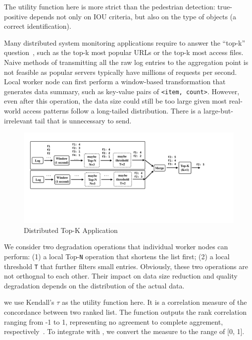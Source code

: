 The utility function here is more strict than the pedestrian detection:
true-positive depends not only on IOU criteria, but also on the type of objects
(a correct identification).

 Many distributed system monitoring applications
require to answer the ``top-k'' question~\cite{babcock2003distributed}, such as
the top-k most popular URLs or the top-k most access files. Naive methods of
transmitting all the raw log entries to the aggregation point is not feasible as
popular servers typically have millions of requests per second. Local worker
node can first perform a window-based transformation that generates data
summary, such as key-value pairs of \texttt{<item, count>}. However, even after
this operation, the data size could still be too large given most real-world
access patterns follow a long-tailed distribution. There is a
large-but-irrelevant tail that is unnecessary to send.

\begin{figure}
  \centering
  \includegraphics[width=\columnwidth]{figures/topk.pdf}
  \caption{Distributed Top-K Application}
  \label{fig:topk}
\end{figure}

We consider two degradation operations that individual worker nodes can perform:
(1) a local Top-\texttt{N} operation that shortens the list first; (2) a local
threshold \texttt{T} that further filters small entries. Obviously, these two
operations are not orthognal to each other. Their impact on data size reduction
and quality degradation depends on the distribution of the actual data.

we use Kendall's $\tau$ as the utility function here. It is a correlation
measure of the concordance between two ranked list. The function outputs the
rank correlation ranging from -1 to 1, representing no agreement to complete
aggrement, respectively~\cite{abdi2007kendall}. To integrate with \sysname{}, we
convert the measure to the range of [0, 1].

